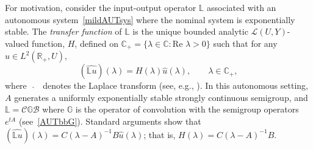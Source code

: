\documentclass[10pt,psamsfonts,leqno]{siamltex}
\newcommand{\bbC}{\mathbb{C}}
\newcommand{\bbR}{\mathbb{R}}
\newcommand{\bbL}{\mathbb{L}}
\newcommand{\bbG}{\mathbb{G}}
\newcommand{\calB}{\mathcal{B}}
\newcommand{\calC}{\mathcal{C}}
\begin{document}
For motivation, consider the input-output operator $\bbL$ associated
with an autonomous system~\eqref{mildAUTsys} where the nominal system is
exponentially stable.  The {\em transfer function} of $\bbL$ is the
unique bounded analytic
$\mathcal{L}(U,Y)$-valued function, $H$, defined on
$\bbC_+=\{\lambda\in{\mathbb C}: \text{Re }\lambda> 0\}$ such that for
any
$u\in L^2(\bbR_+,U)$,
$$
(\widehat{\bbL u})(\lambda)=H(\lambda)\hat{u}(\lambda),\qquad
\lambda\in\bbC_+,
$$
where \, $\widehat{\ }$ \, denotes the
Laplace transform (see, e.g., \cite{Weiss1}).  In this autonomous
setting,
$A$ generates a uniformly exponentially stable strongly continuous
semigroup, and $\bbL=\calC\bbG\calB$ where
$\bbG$ is the operator of convolution with the semigroup
operators $e^{tA}$ (see~\eqref{AUTbbG}).
Standard arguments show that
$(\widehat{\bbL u})(\lambda)=C(\lambda-A)^{-1}B\hat u(\lambda)$; that
is,
$H(\lambda)=C(\lambda-A)^{-1}B$.
\end{document}
